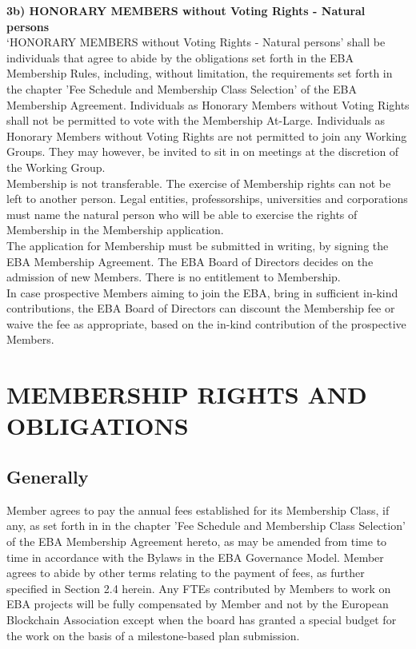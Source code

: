 \documentclass{article}
\begin{document}
\textbf{3b) HONORARY MEMBERS without Voting Rights - Natural persons} \\

‘HONORARY MEMBERS without Voting Rights - Natural persons’ shall be individuals that agree to abide by the obligations set forth in the EBA Membership Rules, including, without limitation, the requirements set forth in the chapter 'Fee Schedule and Membership Class Selection' of the EBA Membership Agreement. 
Individuals as Honorary  Members without Voting Rights shall not be permitted to vote with the Membership At-Large. Individuals as Honorary Members without Voting Rights are not permitted to join any Working Groups. 
They may however, be invited to sit in on meetings at the discretion of the Working Group. \\

Membership is not transferable. 
The exercise of Membership rights can not be left to another person. 
Legal entities, professorships, universities and corporations must name the natural person who will be able to exercise the rights of Membership in the Membership application. \\ 

The application for Membership must be submitted in writing, by signing the EBA Membership Agreement. 
The EBA Board of Directors decides on the admission of new Members. There is no entitlement to Membership. \\

In case prospective Members aiming to join the EBA, bring in sufficient in-kind contributions, the EBA Board of Directors can discount the Membership fee or waive the fee as appropriate, based on the in-kind contribution of the prospective Members.

\section{MEMBERSHIP RIGHTS AND OBLIGATIONS}

\subsection{Generally}

Member agrees to pay the annual fees established for its Membership Class, if any, as set forth in in the chapter 'Fee Schedule and Membership Class Selection' of the EBA Membership Agreement hereto, as may be amended from time to time in accordance with the Bylaws in the EBA Governance Model. 
Member agrees to abide by other terms relating to the payment of fees, as further specified in Section 2.4 herein. 
Any FTEs contributed by Members to work on EBA projects will be fully compensated by Member and not by the European Blockchain Association except when the board has granted a special budget for the work on the basis of a milestone-based plan submission.
\end{document}
